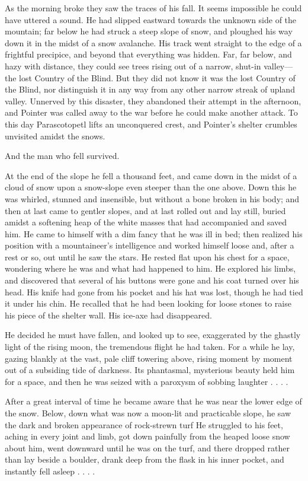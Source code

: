 \documentclass[submission]{sffms}
\begin{document}
As the morning broke they saw the traces of his fall. It seems
impossible he could have uttered a sound. He had slipped eastward
towards the unknown side of the mountain; far below he had struck a
steep slope of snow, and ploughed his way down it in the midst of a
snow avalanche. His track went straight to the edge of a frightful
precipice, and beyond that everything was hidden. Far, far below, and
hazy with distance, they could see trees rising out of a narrow,
shut-in valley---the lost Country of the Blind. But they did not know
it was the lost Country of the Blind, nor distinguish it in any way
from any other narrow streak of upland valley. Unnerved by this
disaster, they abandoned their attempt in the afternoon, and Pointer
was called away to the war before he could make another attack. To
this day Parascotopetl lifts an unconquered crest, and Pointer's
shelter crumbles unvisited amidst the snows.

And the man who fell survived.

At the end of the slope he fell a thousand feet, and came down in the
midst of a cloud of snow upon a snow-slope even steeper than the one
above. Down this he was whirled, stunned and insensible, but without a
bone broken in his body; and then at last came to gentler slopes, and
at last rolled out and lay still, buried amidst a softening heap of
the white masses that had accompanied and saved him. He came to
himself with a dim fancy that he was ill in bed; then realized his
position with a mountaineer's intelligence and worked himself loose
and, after a rest or so, out until he saw the stars. He rested flat
upon his chest for a space, wondering where he was and what had
happened to him. He explored his limbs, and discovered that several of
his buttons were gone and his coat turned over his head. His knife had
gone from his pocket and his hat was lost, though he had tied it under
his chin. He recalled that he had been looking for loose stones to
raise his piece of the shelter wall. His ice-axe had disappeared.

He decided he must have fallen, and looked up to see, exaggerated by
the ghastly light of the rising moon, the tremendous flight he had
taken. For a while he lay, gazing blankly at the vast, pale cliff
towering above, rising moment by moment out of a subsiding tide of
darkness. Its phantasmal, mysterious beauty held him for a space, and
then he was seized with a paroxysm of sobbing laughter . . . .

After a great interval of time he became aware that he was near the
lower edge of the snow. Below, down what was now a moon-lit and
practicable slope, he saw the dark and broken appearance of
rock-strewn turf He struggled to his feet, aching in every joint and
limb, got down painfully from the heaped loose snow about him, went
downward until he was on the turf, and there dropped rather than lay
beside a boulder, drank deep from the flask in his inner pocket, and
instantly fell asleep . . . .
\end{document}
